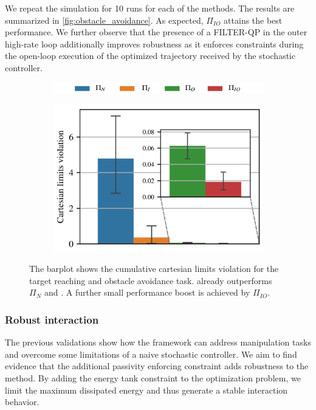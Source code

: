 We repeat the simulation for 10 runs for each of the methods. The results are summarized in \fig \ref{fig:obstacle_avoidance}. As expected, $\Pi_{IO}$ attains the best performance. We further observe that the presence of a FILTER-QP in the outer high-rate loop additionally improves robustness as it enforces constraints during the open-loop execution of the optimized trajectory received by the stochastic controller. 
\begin{figure}[t] \label{fig:obstacle_avoidance}
\begin{subfigure}{1\columnwidth}
    \includegraphics[width=\linewidth]{figures/methods_comparison/legend.pdf}
\end{subfigure}%
\hfill

\begin{subfigure}{1\columnwidth}
    \centering
    \hspace*{-0.2cm} 
    \includegraphics[width=0.6\columnwidth]{figures/obstacle_avoidance/obstacle_avoidance_test_no_legend.pdf}
\end{subfigure}
\caption{The barplot shows the cumulative cartesian limits violation for the target reaching and obstacle avoidance task. \ctrlOuter already outperforms $\Pi_{N}$ and \ctrlInner. A further small performance boost is achieved by $\Pi_{IO}$.}

\end{figure}

\vspace{0.3cm}
\subsubsection{Robust interaction}
The previous validations show how the framework can address manipulation tasks and overcome some limitations of a naive stochastic controller. We aim to find evidence that the additional passivity enforcing constraint adds robustness to the method. By adding the energy tank constraint to the optimization problem, we limit the maximum dissipated energy and thus generate a stable interaction behavior.

